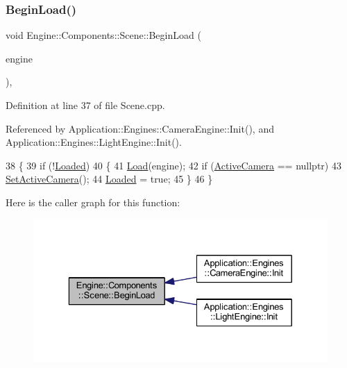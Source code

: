 \subsubsection{\texorpdfstring{Begin\+Load()}{BeginLoad()}}
{\footnotesize\ttfamily void Engine\+::\+Components\+::\+Scene\+::\+Begin\+Load (\begin{DoxyParamCaption}\item[{\mbox{\hyperlink{classEngine_1_1BaseEngine}{Base\+Engine}} $\ast$}]{engine }\end{DoxyParamCaption})\hspace{0.3cm}{\ttfamily [virtual]}, {\ttfamily [inherited]}}



Definition at line 37 of file Scene.\+cpp.



Referenced by Application\+::\+Engines\+::\+Camera\+Engine\+::\+Init(), and Application\+::\+Engines\+::\+Light\+Engine\+::\+Init().


\begin{DoxyCode}
38 \{
39     \textcolor{keywordflow}{if} (!\mbox{\hyperlink{classEngine_1_1Components_1_1Scene_ae828757eea5410550f6674421051a783}{Loaded}})
40     \{
41         \mbox{\hyperlink{classEngine_1_1Components_1_1Scene_a23c5b23e66646443670a487e7c016e73}{Load}}(engine);
42         \textcolor{keywordflow}{if} (\mbox{\hyperlink{classEngine_1_1Components_1_1Scene_a9408befee37d89e2c001d25b9e4ed75a}{ActiveCamera}} == \textcolor{keyword}{nullptr})
43             \mbox{\hyperlink{classEngine_1_1Components_1_1Scene_a936218df56c481f3aa12d684cee038f3}{SetActiveCamera}}();
44         \mbox{\hyperlink{classEngine_1_1Components_1_1Scene_ae828757eea5410550f6674421051a783}{Loaded}} = \textcolor{keyword}{true};
45     \}
46 \}
\end{DoxyCode}
Here is the caller graph for this function\+:
\nopagebreak
\begin{figure}[H]
\begin{center}
\leavevmode
\includegraphics[width=329pt]{classEngine_1_1Components_1_1Scene_af18bd334fe66952b8d79b8e9e99ab2d8_icgraph}
\end{center}
\end{figure}
\mbox{\label{classApplication_1_1Scenes_1_1SphereScene_ad754dea94c77524a79d707436a933c66}} 
